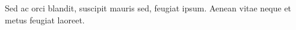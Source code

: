 \begin{dedication}
 
Sed ac orci blandit, suscipit mauris sed, feugiat ipsum. Aenean vitae neque et metus feugiat laoreet.

\end{dedication}